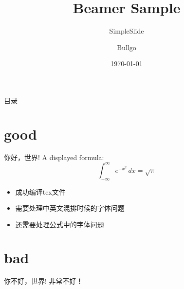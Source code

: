 \documentclass[12pt,compress]{beamer}
\title{Beamer Sample}
\subtitle{SimpleSlide}
\institute{HFUT}
\author{Bullgo}
\date{\today}
\begin{document}
  

\begin{frame}
	\titlepage
\end{frame}

\begin{frame}{目录}
	\tableofcontents  
\end{frame}

\section{good}
\begin{frame} {你好，世界!}  
A displayed formula:  
    \[  
      \int_{-\infty}^\infty e^{-x^2} \, dx = \sqrt{\pi}  
    \]  
\begin{itemize}  
\item 成功编译tex文件  
\item 需要处理中英文混排时候的字体问题    
\item 还需要处理公式中的字体问题  
\end{itemize}  
\end{frame}


\section{bad}
\begin{frame} {你不好，世界!}  
非常不好！
\end{frame}
\end{document}
